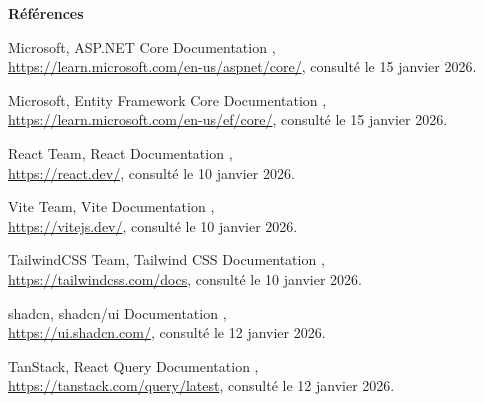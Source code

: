 \clearpage
\thispagestyle{plain}

\vspace*{2cm}

\begin{center}
{\fontsize{24}{29}\selectfont\bfseries Références}
\end{center}

\vspace{1.5cm}

\begin{enumerate}[label={[\arabic*]}]
    \item Microsoft, \og ASP.NET Core Documentation \fg{},\\
    \url{https://learn.microsoft.com/en-us/aspnet/core/}, consulté le 15 janvier 2026.

    \item Microsoft, \og Entity Framework Core Documentation \fg{},\\
    \url{https://learn.microsoft.com/en-us/ef/core/}, consulté le 15 janvier 2026.

    \item React Team, \og React Documentation \fg{},\\
    \url{https://react.dev/}, consulté le 10 janvier 2026.

    \item Vite Team, \og Vite Documentation \fg{},\\
    \url{https://vitejs.dev/}, consulté le 10 janvier 2026.

    \item TailwindCSS Team, \og Tailwind CSS Documentation \fg{},\\
    \url{https://tailwindcss.com/docs}, consulté le 10 janvier 2026.

    \item shadcn, \og shadcn/ui Documentation \fg{},\\
    \url{https://ui.shadcn.com/}, consulté le 12 janvier 2026.

    \item TanStack, \og React Query Documentation \fg{},\\
    \url{https://tanstack.com/query/latest}, consulté le 12 janvier 2026.


\end{enumerate}
